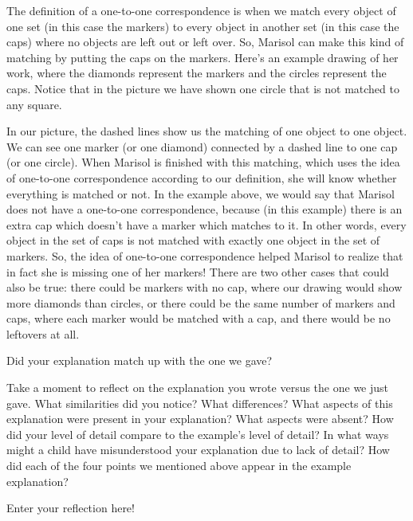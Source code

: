 \documentclass[noauthor,nooutcomes]{ximera}
\begin{document}
\begin{problem}
\begin{problem}
The definition of a one-to-one correspondence is when we match every object of one set (in this case the markers) 
to every object in another set (in this case the caps) where no objects are left out or left over. So, Marisol can 
make this kind of matching by putting the caps on the markers. Here's an example drawing of her work, where the 
diamonds represent the markers and the circles represent the caps. Notice that in the picture we have shown one circle 
that is not matched to any square.
\begin{image}
\end{image}
In our picture, the dashed lines show us the matching of one object to one object. We can see one marker (or one diamond) 
connected by a dashed line to one cap (or one circle). When Marisol is finished with this matching, which uses the idea 
of one-to-one correspondence according to our definition, she will know whether everything is matched or not. In the 
example above, we would say that Marisol does not have a one-to-one correspondence, because (in this example) there is 
an extra cap which doesn't have a marker which matches to it. In other words, every object in the set of caps is not 
matched with exactly one object in the set of markers. So, the idea of one-to-one correspondence helped Marisol to 
realize that in fact she is missing one of her markers! There are two other cases that could also be true: there could 
be markers with no cap, where our drawing would show more diamonds than circles, or there could be the same number of markers and caps, where each marker would be matched with a cap, and there would be no leftovers at all.

\begin{prompt}
	Did your explanation match up with the one we gave?
	\begin{multipleChoice}
	\end{multipleChoice}
\end{prompt}
\end{problem}
\end{problem}

Take a moment to reflect on the explanation you wrote versus the one we just gave. What similarities did you notice? What differences? What aspects of this explanation were present in your explanation? What aspects were absent? How did your level of detail compare to the example's level of detail? In what ways might a child have misunderstood your explanation due to lack of detail? How did each of the four points we mentioned above appear in the example explanation?
\begin{freeResponse}
	Enter your reflection here!
\end{freeResponse}
\end{document}

